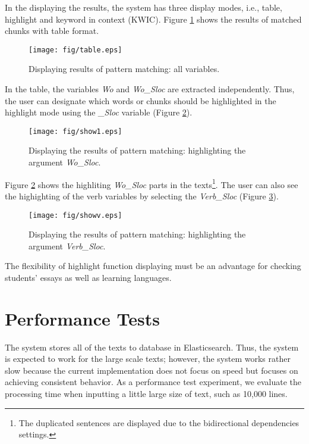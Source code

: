 \documentclass[conference]{IEEEtran}
\begin{document}
In the displaying the results, the system has three display modes, i.e.,
table, highlight and keyword in context (KWIC).
Figure \ref{fig:table} shows the results of matched chunks with table format. 

\begin{figure}[htbp]
\centerline{\texttt{[image: fig/table.eps]}}
\caption{Displaying results of pattern matching: all variables.}
\label{fig:table}
\end{figure}

In the table, the variables {\it Wo} and {\it Wo\_Sloc} are extracted
independently. Thus, the user can designate which words or chunks should be highlighted in
the highlight mode using the {\it \_Sloc} variable (Figure \ref{fig:show1}). 

\begin{figure}[htbp]
\centerline{\texttt{[image: fig/show1.eps]}}
\caption{Displaying the results of pattern matching: highlighting the argument {\it Wo\_Sloc}.}
\label{fig:show1}
\end{figure}

Figure \ref{fig:show1} shows the highliting {\it Wo\_Sloc} parts in the texts\footnote{The duplicated
sentences are displayed due to the bidirectional dependencies settings.}.
The user can also see the highighting of the verb variables by selecting the {\it Verb\_Sloc} (Figure \ref{fig:showv}). 

\begin{figure}[htbp]
\centerline{\texttt{[image: fig/showv.eps]}}
\caption{Displaying the results of pattern matching: highlighting the argument {\it Verb\_Sloc}.}
\label{fig:showv}
\end{figure}

The flexibility of highlight function displaying must be an advantage for checking students' essays as well as
learning languages. 

\section{Performance Tests}
\label{sec:experiment}
The system stores all of the texts to database in Elasticsearch. Thus,
the system is expected to work for the large scale texts; however, the
system works rather slow because the current implementation does not
focus on speed but focuses on achieving consistent behavior.  As a
performance test experiment, we evaluate the processing time when
inputting a little large size of text, such as 10,000 lines.
\end{document}
